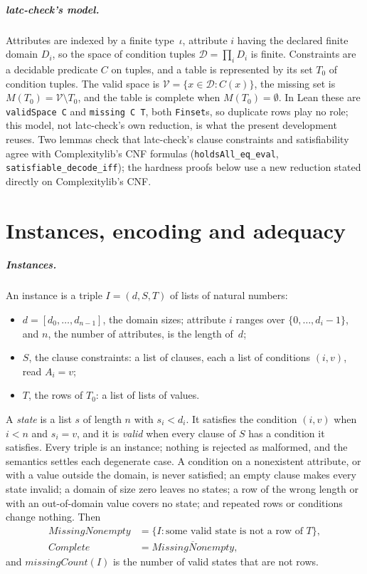 \documentclass[a4paper,UKenglish,cleveref,autoref,thm-restate]{lipics-v2021}
\begin{document}
\subparagraph*{latc-check's model.}
Attributes are indexed by a finite type~$\iota$, attribute $i$ having the declared finite domain
$D_i$, so the space of condition tuples $\mathcal{D} = \prod_i D_i$ is finite. Constraints are a
decidable predicate $C$ on tuples, and a table is represented by its set $T_0$ of condition
tuples. The valid space is $\mathcal{V} = \{x \in \mathcal{D} : C(x)\}$, the missing set is
$M(T_0) = \mathcal{V} \setminus T_0$, and the table is complete when $M(T_0) = \emptyset$. In
Lean these are \lstinline{validSpace C} and \lstinline{missing C T}, both \lstinline{Finset}s, so
duplicate rows play no role; this model, not latc-check's own reduction, is what the present
development reuses. Two lemmas check that latc-check's clause constraints and satisfiability agree
with Complexitylib's CNF formulas (\lstinline{holdsAll_eq_eval},
\lstinline{satisfiable_decode_iff}); the hardness proofs below use a new reduction stated
directly on Complexitylib's CNF.

\section{Instances, encoding and adequacy}
\label{sec:encoding}

\subparagraph*{Instances.}
An instance is a triple $I = (d, S, T)$ of lists of natural numbers:
\begin{itemize}
\item $d = [d_0, \dots, d_{n-1}]$, the domain sizes; attribute $i$ ranges over
  $\{0, \dots, d_i - 1\}$, and $n$, the number of attributes, is the length of~$d$;
\item $S$, the clause constraints: a list of clauses, each a list of conditions $(i, v)$, read
  $A_i = v$;
\item $T$, the rows of $T_0$: a list of lists of values.
\end{itemize}
A \emph{state} is a list $s$ of length $n$ with $s_i < d_i$. It satisfies the condition $(i, v)$
when $i < n$ and $s_i = v$, and it is \emph{valid} when every clause of $S$ has a condition it
satisfies. Every triple is an instance; nothing is rejected as malformed, and the semantics
settles each degenerate case. A condition on a nonexistent attribute, or with a value outside
the domain, is never satisfied; an empty clause makes every state invalid; a domain of size
zero leaves no states; a row of the wrong length or with an out-of-domain value covers no state;
and repeated rows or conditions change nothing. Then
\begin{align*}
\textit{MissingNonempty} &= \{I : \text{some valid state is not a row of } T\},\\
\textit{Complete} &= \overline{\textit{MissingNonempty}},
\end{align*}
and $\textit{missingCount}(I)$ is the number of valid states that are not rows.
\end{document}

